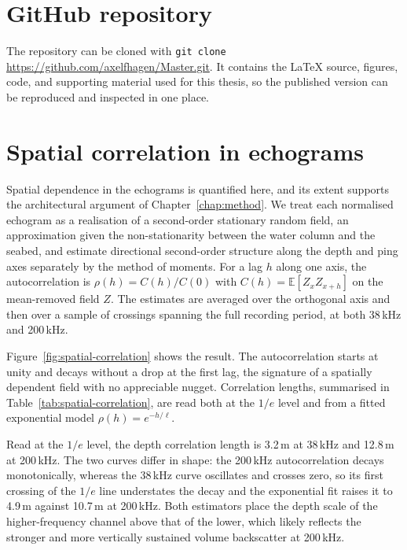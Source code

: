 

\chapter{GitHub repository}
\label{app:github-repository}

The repository can be cloned with \texttt{git clone} \url{https://github.com/axelfhagen/Master.git}. It contains the LaTeX source, figures, code, and supporting material used for this thesis, so the published version can be reproduced and inspected in one place.







\chapter{Spatial correlation in echograms}
\label{app:spatial-correlation}

Spatial dependence in the echograms is quantified here, and its extent supports the architectural argument of Chapter~\ref{chap:method}. We treat each normalised echogram as a realisation of a second-order stationary random field, an approximation given the non-stationarity between the water column and the seabed, and estimate directional second-order structure along the depth and ping axes separately by the method of moments. For a lag $h$ along one axis, the autocorrelation is $\rho(h) = C(h)/C(0)$ with $C(h) = \mathbb{E}[Z_x Z_{x+h}]$ on the mean-removed field $Z$. The estimates are averaged over the orthogonal axis and then over a sample of crossings spanning the full recording period, at both 38\,kHz and 200\,kHz.

Figure~\ref{fig:spatial-correlation} shows the result. The autocorrelation starts at unity and decays without a drop at the first lag, the signature of a spatially dependent field with no appreciable nugget. Correlation lengths, summarised in Table~\ref{tab:spatial-correlation}, are read both at the $1/e$ level and from a fitted exponential model $\rho(h)=e^{-h/\ell}$.

Read at the $1/e$ level, the depth correlation length is 3.2\,m at 38\,kHz and 12.8\,m at 200\,kHz. The two curves differ in shape: the 200\,kHz autocorrelation decays monotonically, whereas the 38\,kHz curve oscillates and crosses zero, so its first crossing of the $1/e$ line understates the decay and the exponential fit raises it to 4.9\,m against 10.7\,m at 200\,kHz. Both estimators place the depth scale of the higher-frequency channel above that of the lower, which likely reflects the stronger and more vertically sustained volume backscatter at 200\,kHz.

